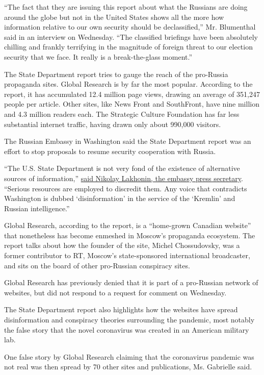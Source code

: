 ``The fact that they are issuing this report about what the Russians are
doing around the globe but not in the United States shows all the more
how information relative to our own security should be declassified,''
Mr. Blumenthal said in an interview on Wednesday. ``The classified
briefings have been absolutely chilling and frankly terrifying in the
magnitude of foreign threat to our election security that we face. It
really is a break-the-glass moment.''

The State Department report tries to gauge the reach of the pro-Russia
propaganda sites. Global Research is by far the most popular. According
to the report, it has accumulated 12.4 million page views, drawing an
average of 351,247 people per article. Other sites, like News Front and
SouthFront, have nine million and 4.3 million readers each. The
Strategic Culture Foundation has far less substantial internet traffic,
having drawn only about 990,000 visitors.

The Russian Embassy in Washington said the State Department report was
an effort to stop proposals to resume security cooperation with Russia.

``The U.S. State Department is not very fond of the existence of
alternative sources of information,''
\href{https://twitter.com/rusembusa/status/1291184519316475904?s=21}{said
Nikolay Lakhonin, the embassy press secretary}. ``Serious resources are
employed to discredit them. Any voice that contradicts Washington is
dubbed `disinformation' in the service of the `Kremlin' and Russian
intelligence.''

Global Research, according to the report, is a ``home-grown Canadian
website'' that nonetheless has become enmeshed in Moscow's propaganda
ecosystem. The report talks about how the founder of the site, Michel
Chossudovsky, was a former contributor to RT, Moscow's state-sponsored
international broadcaster, and sits on the board of other pro-Russian
conspiracy sites.

Global Research has previously denied that it is part of a pro-Russian
network of websites, but did not respond to a request for comment on
Wednesday.

The State Department report also highlights how the websites have spread
disinformation and conspiracy theories surrounding the pandemic, most
notably the false story that the novel coronavirus was created in an
American military lab.

One false story by Global Research claiming that the coronavirus
pandemic was not real was then spread by 70 other sites and
publications, Ms. Gabrielle said.

